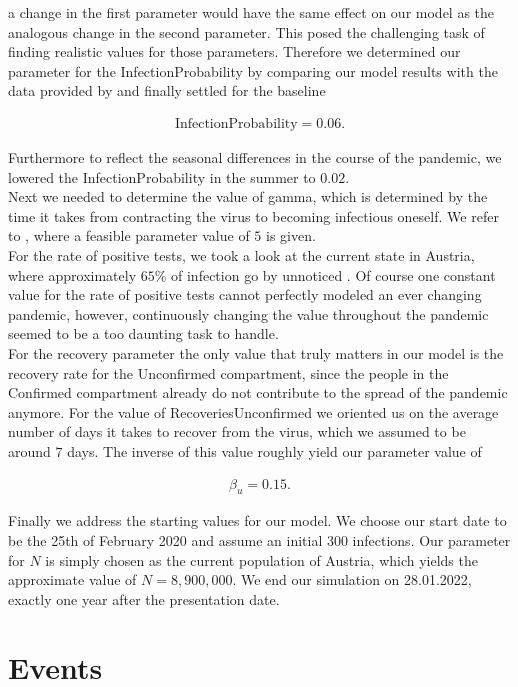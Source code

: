 \documentclass
[
    a4paper,
    11pt,
    bibliography = totoc,
    listof = totoc,
    headinclude = true,
]
{scrreport}
\begin{document}
a change in the first parameter would have the same effect on our model
as the analogous change in the second parameter.
This posed the challenging task of finding realistic values for those parameters.
Therefore we determined our parameter for the InfectionProbability by comparing
our model results with the data provided by \cite{OrfCorona} and finally
settled for the baseline

\begin{align*}
  \text{InfectionProbability} = 0.06.
\end{align*}

Furthermore to reflect the seasonal differences in the course of the pandemic,
we lowered the InfectionProbability in the summer to $0.02$. \\
Next we needed to determine the value of gamma, which is determined by the time
it takes from contracting the virus to becoming infectious oneself.
We refer to \cite{RobertKochInstitut}, where a feasible parameter value of $5$ is given. \\
For the rate of positive tests, we took a look at the current state in Austria,
where approximately $65\%$ of infection go by unnoticed \cite{MassTests}.
Of course one constant value for the rate of positive tests cannot perfectly
modeled an ever changing pandemic, however, continuously changing the value
throughout the pandemic seemed to be a too daunting task to handle. \\
For the recovery parameter the only value that truly matters in our model
is the recovery rate for the Unconfirmed compartment, since the people in the
Confirmed compartment already do not contribute to the spread of the pandemic anymore.
For the value of RecoveriesUnconfirmed we oriented us on the average number of days
it takes to recover from the virus, which we assumed to be around $7$ days.
The inverse of this value roughly yield our parameter value of

\begin{align*}
  \beta_u = 0.15.
\end{align*}

Finally we address the starting values for our model. We choose our start date
to be the 25th of February 2020 and assume an initial 300 infections.
Our parameter for $N$ is simply chosen as the current population of Austria,
which yields the approximate value of $N = 8,900,000$.
We end our simulation on 28.01.2022, exactly one year after the presentation date.

\section{Events}
\end{document}
